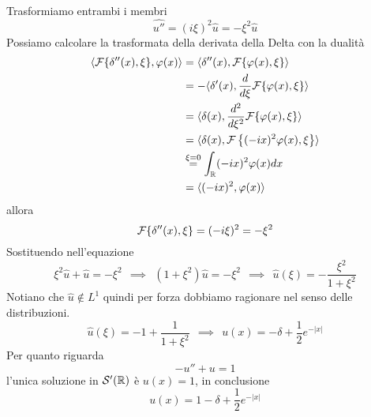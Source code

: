 Trasformiamo entrambi i membri
\begin{equation*}
\widehat{u''} = (i\xi)^{2}\hat{u} = - \xi^{2}\hat{u}
\end{equation*}
Possiamo calcolare la trasformata della derivata della Delta con la dualità
\begin{align*}
\langle \mathcal{F} \{\delta ''(x), \xi \}, \varphi (x) \rangle  & = \langle \delta ''(x), \mathcal{F} \{\varphi (x), \xi \} \rangle \\
 & = - \langle \delta '(x), \frac{d}{d\xi}\mathcal{F} \{\varphi (x), \xi \} \rangle \\
 & = \langle \delta (x), \frac{d^{2}}{d\xi^{2}}\mathcal{F} \{\varphi (x), \xi \} \rangle \\
 & = \langle \delta (x), \mathcal{F} \left\{(- ix)^{2} \varphi (x), \xi \right\} \rangle \\
 & \overset{\xi = 0}{=}\int_{\mathbb{R}}(- ix)^{2} \varphi (x) dx\\
 & = \langle (- ix)^{2}, \varphi (x) \rangle 
\end{align*}
allora
\begin{equation*}
\mathcal{F} \{\delta ''(x), \xi \} = (- i\xi)^{2} = - \xi^{2}
\end{equation*}
Sostituendo nell'equazione
\begin{equation*}
\xi^{2}\hat{u} + \hat{u} = - \xi^{2} \ \ \implies \ \ \left(1 + \xi^{2}\right)\hat{u} = - \xi^{2} \ \ \implies \ \ \hat{u}(\xi) = - \frac{\xi^{2}}{1 + \xi^{2}}
\end{equation*}
Notiano che $\hat{u} \notin L^{1}$ quindi per forza dobbiamo ragionare nel senso delle distribuzioni.
\begin{equation*}
\hat{u}(\xi) = - 1 + \frac{1}{1 + \xi^{2}} \ \ \implies \ \ u(x) = - \delta + \frac{1}{2} e^{- | x|}
\end{equation*}
Per quanto riguarda
\begin{equation*}
- u'' + u = 1
\end{equation*}
l'unica soluzione in $\mathcal{S}  '(\mathbb{R})$ è $u(x) = 1$, in conclusione
\begin{equation*}
u(x) = 1 - \delta + \frac{1}{2} e^{- | x|}
\end{equation*}
\Soluzione

